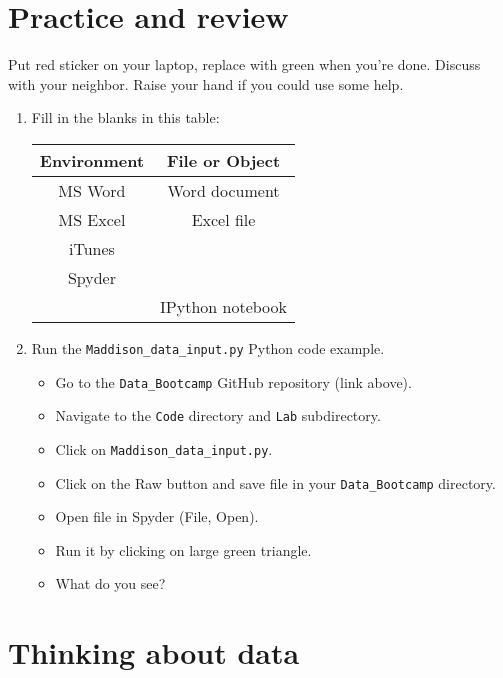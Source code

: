 \documentclass[11pt]{article}
\begin{document}
\section*{Practice and review}


Put red sticker on your laptop, replace with green when you're done.  
Discuss with your neighbor.  
Raise your hand if you could use some help.

\begin{enumerate}

\item Fill in the blanks in this table:

\begin{center}
\begin{tabular}{cc}
\toprule
Environment & File or Object \\
\midrule
MS Word  & Word document  \\
MS Excel & Excel file     \\
iTunes & \\
Spyder   &                \\
         & IPython notebook \\
\bottomrule
\end{tabular}
\end{center}


\item Run the \verb|Maddison_data_input.py| Python code example.
\begin{itemize}
\item Go to the \verb|Data_Bootcamp| GitHub repository (link above).
\item Navigate to the {\tt Code} directory and {\tt Lab} subdirectory.
\item Click on \verb|Maddison_data_input.py|.
\item Click on the Raw button and save file in your \verb|Data_Bootcamp|
directory.
\item Open file in Spyder (File, Open).
\item Run it by clicking on large green triangle.
\item What do you see?
\end{itemize}

\end{enumerate}


\section*{Thinking about data}
\end{document}
